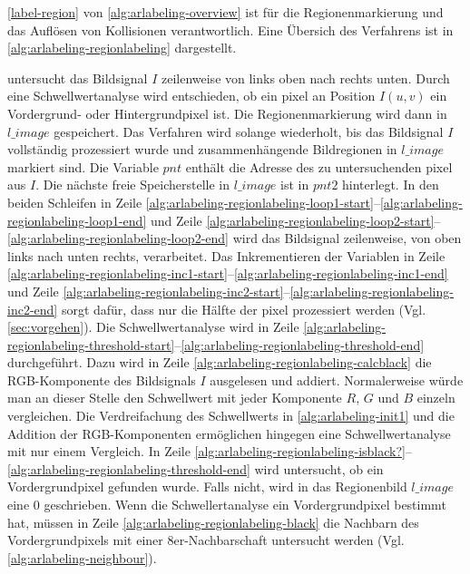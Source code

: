 \autoref{label-region} von \autoref{alg:arlabeling-overview} ist für die Regionenmarkierung und das Auflösen von
 Kollisionen verantwortlich. Eine Übersich des Verfahrens ist in \autoref{alg:arlabeling-regionlabeling} dargestellt.

  untersucht das Bildsignal $I$ zeilenweise von links oben nach rechts unten. Durch eine
 Schwellwertanalyse wird entschieden, ob ein \gls{pixel} an Position $I(u,v)$ ein Vordergrund- oder Hintergrundpixel
 ist. Die Regionenmarkierung wird dann in $\mathit{l\_image}$ gespeichert. Das Verfahren wird solange wiederholt, bis
 das Bildsignal $I$ vollständig prozessiert wurde und zusammenhängende Bildregionen in $\mathit{l\_image}$ markiert
 sind. Die Variable $\mathit{pnt}$ enthält die Adresse des zu untersuchenden \gls{pixel} aus $I$. Die nächste freie
 Speicherstelle in $\mathit{l\_image}$ ist in $\mathit{pnt2}$ hinterlegt. In den beiden Schleifen in Zeile
 \ref{alg:arlabeling-regionlabeling-loop1-start}--\ref{alg:arlabeling-regionlabeling-loop1-end} und Zeile
 \ref{alg:arlabeling-regionlabeling-loop2-start}--\ref{alg:arlabeling-regionlabeling-loop2-end} wird das Bildsignal
 zeilenweise, von oben links nach unten rechts, verarbeitet. Das Inkrementieren der Variablen in Zeile
 \ref{alg:arlabeling-regionlabeling-inc1-start}--\ref{alg:arlabeling-regionlabeling-inc1-end} und Zeile
 \ref{alg:arlabeling-regionlabeling-inc2-start}--\ref{alg:arlabeling-regionlabeling-inc2-end} sorgt dafür, dass nur die
 Hälfte der \gls{pixel} prozessiert werden (Vgl. \autoref{sec:vorgehen}). Die Schwellwertanalyse wird in Zeile
 \ref{alg:arlabeling-regionlabeling-threshold-start}--\ref{alg:arlabeling-regionlabeling-threshold-end} durchgeführt.
 Dazu wird in Zeile \ref{alg:arlabeling-regionlabeling-calcblack} die RGB-Komponente des Bildsignals $I$ ausgelesen und
 addiert. Normalerweise würde man an dieser Stelle den Schwellwert mit jeder Komponente $R$, $G$ und $B$ einzeln
 vergleichen. Die Verdreifachung des Schwellwerts in \autoref{alg:arlabeling-init1} und die Addition der
 RGB-Komponenten ermöglichen hingegen eine Schwellwertanalyse mit nur einem Vergleich.\label{sub:arlabel-threshold} In
 Zeile \ref{alg:arlabeling-regionlabeling-isblack?}--\ref{alg:arlabeling-regionlabeling-threshold-end} wird
 untersucht, ob ein Vordergrundpixel gefunden wurde. Falls nicht, wird in das Regionenbild $\mathit{l\_image}$ eine $0$
 geschrieben. Wenn die Schwellertanalyse ein Vordergrundpixel bestimmt hat, müssen in Zeile
 \ref{alg:arlabeling-regionlabeling-black} die Nachbarn des Vordergrundpixels mit einer 8er-Nachbarschaft untersucht
 werden (Vgl. \autoref{alg:arlabeling-neighbour}).

